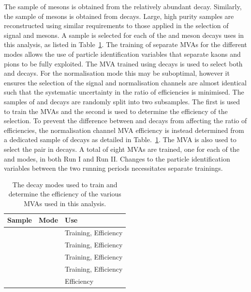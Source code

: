 The sample of \Dsp mesons is obtained from the relatively abundant \decay{\Bsb}{\Dsp\pim} decay. Similarly, the sample of \phiz mesons is obtained from \decay{\Bs}{\jpsi\phiz} decays. Large, high purity samples are reconstructed using similar requirements to those applied in the selection of signal \Dsp and \phiz mesons.
A sample is selected for each of the \Dsp and \phiz meson decays uses in this analysis, as listed in Table~\ref{tab:mva_modes}. 
The training of separate MVAs for the different \Dsp modes allows the use of particle identification variables that separate kaons and pions to be fully exploited.
The MVA trained using \decay{\Bs}{\jpsi(\decay{\phiz}{\Kp\Km})} decays is used to select both \decay{\phiz}{\Kp}{\Km} and \decay{\Dzb}{\Kp\Km} decays. For the normalisation mode this may be suboptimal, however it ensures the selection of the signal and normalisation channels are almost identical such that the systematic uncertainty in the ratio of efficiencies is minimised.
The samples of \decay{\Bsb}{\Dsp\pim} and \decay{\Bs}{\jpsi\phiz} decays are randomly split into two subsamples. The first is used to train the MVAs and the second is used to determine the efficiency of the selection. To prevent the difference between \phiz and \Dzb decays from affecting the ratio of efficiencies, the normalisation channel MVA efficiency is instead determined from a dedicated sample of \decay{\Dzb}{\Kp\Km} decays as detailed in Table.~\ref{tab:mva_modes}. The \decay{\phiz}{\Kp\Km} MVA is also used to select the \Kp\Km pair in \decay{\Bp}{\Dsp\Kp\Km} decays.
A total of eight MVAs are trained, one for each of the \Dsp and \phiz modes, in both Run I and Run II. Changes to the particle identification variables between the two running periods necessitates separate trainings. 


\begin{table}[h]
\centering
\begin{tabular}{lll}
   \hline
   Sample                    & Mode                       & Use \\ 
   \hline
   \decay{\Bsb}{\Dsp\pim}    & \decay{\Dsp}{\Kp\Km\pip}   & Training, Efficiency \\
   \decay{\Bsb}{\Dsp\pim}    & \decay{\Dsp}{\Kp\pim\pip}  & Training, Efficiency \\
   \decay{\Bsb}{\Dsp\pim}    & \decay{\Dsp}{\pip\pim\pip} & Training, Efficiency \\
   \decay{\Bs}{\jpsi\phiz}   & \decay{\phiz}{\Kp\Km}      & Training, Efficiency \\
   \hline
   \decay{\Bp}{\Dzb\pip}     & \decay{\Dzb}{\Kp\Km}       & Efficiency          \\
   \hline
\end{tabular}

\caption{The decay modes used to train and determine the efficiency of the various MVAs used in this analysis.}
\label{tab:mva_modes}
\end{table}

